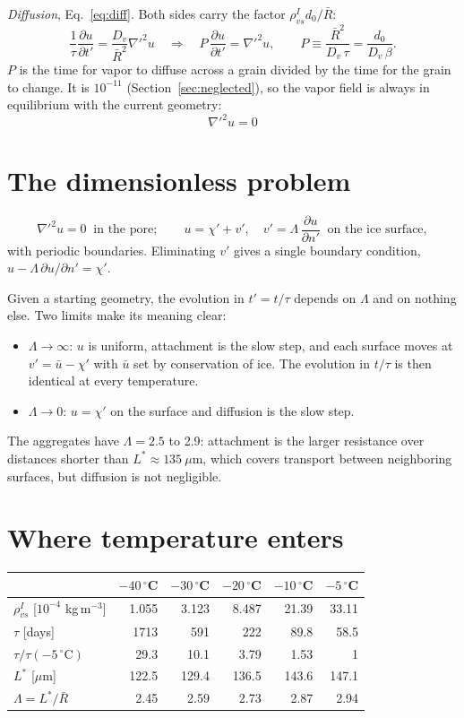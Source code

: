 \documentclass[11pt]{article}
\begin{document}
\emph{Diffusion}, Eq.~\eqref{eq:diff}. Both sides carry the factor
$\rho_{vs}^{I} d_0/\bar R$:
\[
\frac{1}{\tau}\frac{\partial u}{\partial t'} = \frac{D_v}{\bar R^{2}}\nabla'^{2}u
\quad\Longrightarrow\quad
P\,\frac{\partial u}{\partial t'} = \nabla'^{2}u ,
\qquad
P \equiv \frac{\bar R^{2}}{D_v\,\tau} = \frac{d_0}{D_v\,\beta} .
\]
$P$ is the time for vapor to diffuse across a grain divided by the time for
the grain to change. It is $10^{-11}$ (Section~\ref{sec:neglected}), so the
vapor field is always in equilibrium with the current geometry:
\[
\boxed{\,\nabla'^{2}u = 0\,}
\]

\section{The dimensionless problem}

\begin{equation}
\nabla'^{2}u = 0 \ \text{ in the pore};\qquad
u = \chi' + v', \quad v' = \Lambda\,\frac{\partial u}{\partial n'} \ \text{ on the ice surface},
\end{equation}
with periodic boundaries. Eliminating $v'$ gives a single boundary condition,
$u - \Lambda\,\partial u/\partial n' = \chi'$.

Given a starting geometry, the evolution in $t' = t/\tau$ depends on
$\Lambda$ and on nothing else. Two limits make its meaning clear:
\begin{itemize}
\item $\Lambda \to \infty$: $u$ is uniform, attachment is the slow step,
  and each surface moves at $v' = \bar u - \chi'$ with $\bar u$ set by
  conservation of ice. The evolution in $t/\tau$ is then identical at
  every temperature.
\item $\Lambda \to 0$: $u = \chi'$ on the surface and diffusion is the slow
  step.
\end{itemize}
The aggregates have $\Lambda = 2.5$ to 2.9: attachment is the larger
resistance over distances shorter than $L^{*} \approx 135~\mu$m, which
covers transport between neighboring surfaces, but diffusion is not
negligible.

\section{Where temperature enters}

\begin{center}\begin{tabular}{lrrrrr}\toprule
 & $-40\,^{\circ}$C & $-30\,^{\circ}$C & $-20\,^{\circ}$C & $-10\,^{\circ}$C & $-5\,^{\circ}$C\\\midrule
$\rho_{vs}^{I}$ [$10^{-4}$ kg\,m$^{-3}$] & 1.055 & 3.123 & 8.487 & 21.39 & 33.11\\
$\tau$ [days] & 1713 & 591 & 222 & 89.8 & 58.5\\
$\tau/\tau(-5\,^{\circ}\mathrm{C})$ & 29.3 & 10.1 & 3.79 & 1.53 & 1\\
$L^{*}$ [$\mu$m] & 122.5 & 129.4 & 136.5 & 143.6 & 147.1\\
$\Lambda = L^{*}/\bar R$ & 2.45 & 2.59 & 2.73 & 2.87 & 2.94\\\bottomrule
\end{tabular}\end{center}
\end{document}
